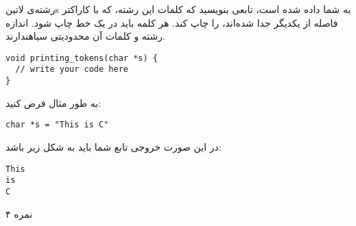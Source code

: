 
رشته‌ی ‌لاتین{s} به شما داده شده است، تابعی بنویسید که کلمات این رشته، که با کاراکتر فاصله از یکدیگر جدا شده‌اند، را چاپ کند.
هر کلمه باید در یک خط چاپ شود.
اندازه رشته و کلمات آن محدودیتی ‌سیاه{ندارند}.

\begin{latin}
\begin{verbatim}
void printing_tokens(char *s) {
  // write your code here
}
\end{verbatim}
\end{latin}

به طور مثال فرض کنید:

\begin{latin}
\begin{verbatim}
char *s = "This is C"
\end{verbatim}
\end{latin}

در این صورت خروجی تابع شما باید به شکل زیر باشد:

\begin{latin}
\begin{verbatim}
This
is
C
\end{verbatim}
\end{latin}


۴ نمره
